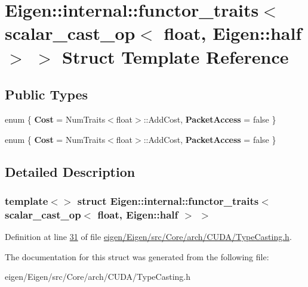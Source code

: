 \hypertarget{struct_eigen_1_1internal_1_1functor__traits_3_01scalar__cast__op_3_01float_00_01_eigen_1_1half_01_4_01_4}{}\section{Eigen\+:\+:internal\+:\+:functor\+\_\+traits$<$ scalar\+\_\+cast\+\_\+op$<$ float, Eigen\+:\+:half $>$ $>$ Struct Template Reference}
\label{struct_eigen_1_1internal_1_1functor__traits_3_01scalar__cast__op_3_01float_00_01_eigen_1_1half_01_4_01_4}
\subsection*{Public Types}
\begin{DoxyCompactItemize}
\item 
\mbox{\label{struct_eigen_1_1internal_1_1functor__traits_3_01scalar__cast__op_3_01float_00_01_eigen_1_1half_01_4_01_4_afdabf2cbc8d1d72d6536e608810798c7}} 
enum \{ {\bfseries Cost} = Num\+Traits$<$float$>$\+:\+:Add\+Cost, 
{\bfseries Packet\+Access} = false
 \}
\item 
\mbox{\label{struct_eigen_1_1internal_1_1functor__traits_3_01scalar__cast__op_3_01float_00_01_eigen_1_1half_01_4_01_4_ae6cd7f46e17a267c7726d65db0162887}} 
enum \{ {\bfseries Cost} = Num\+Traits$<$float$>$\+:\+:Add\+Cost, 
{\bfseries Packet\+Access} = false
 \}
\end{DoxyCompactItemize}


\subsection{Detailed Description}
\subsubsection*{template$<$$>$\newline
struct Eigen\+::internal\+::functor\+\_\+traits$<$ scalar\+\_\+cast\+\_\+op$<$ float, Eigen\+::half $>$ $>$}



Definition at line \hyperlink{eigen_2_eigen_2src_2_core_2arch_2_c_u_d_a_2_type_casting_8h_source_l00031}{31} of file \hyperlink{eigen_2_eigen_2src_2_core_2arch_2_c_u_d_a_2_type_casting_8h_source}{eigen/\+Eigen/src/\+Core/arch/\+C\+U\+D\+A/\+Type\+Casting.\+h}.



The documentation for this struct was generated from the following file\+:\begin{DoxyCompactItemize}
\item 
eigen/\+Eigen/src/\+Core/arch/\+C\+U\+D\+A/\+Type\+Casting.\+h\end{DoxyCompactItemize}
